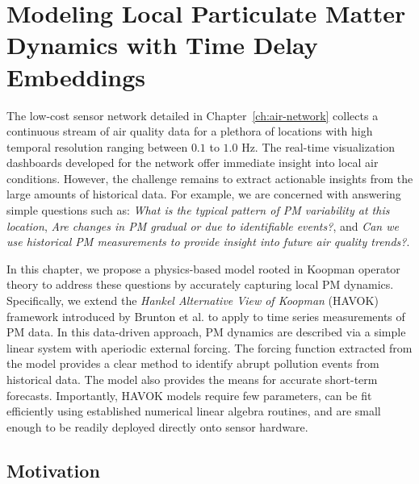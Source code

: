 \chapter{Modeling Local Particulate Matter Dynamics with Time Delay Embeddings}\label{ch:havok}

The low-cost sensor network detailed in Chapter~\ref{ch:air-network} collects a
continuous stream of air quality data for a plethora of locations with high
temporal resolution ranging between $0.1$ to $1.0$ Hz. The real-time
visualization dashboards developed for the network offer immediate insight into
local air conditions. However, the challenge remains to extract actionable
insights from the large amounts of historical data. For example, we are concerned
with answering simple questions such as: \textit{What is the typical pattern of
  PM variability at this location}, \textit{Are changes in PM gradual or due to
  identifiable events?}, and \textit{Can we use historical PM measurements to
  provide insight into future air quality trends?}.

In this chapter, we propose a physics-based model rooted in Koopman operator
theory to address these questions by accurately capturing local PM dynamics.
Specifically, we extend the \textit{Hankel Alternative View of Koopman} (HAVOK)
framework introduced by Brunton et al. to apply to time series measurements of
PM data. In this data-driven approach, PM dynamics are described via a simple
linear system with aperiodic external forcing. The forcing function extracted
from the model provides a clear method to identify abrupt pollution events from
historical data. The model also provides the means for  accurate short-term
forecasts. Importantly, HAVOK models require few parameters, can be fit
efficiently using established numerical linear algebra routines, and are small
enough to be readily deployed directly onto sensor hardware.


\section{Motivation}


